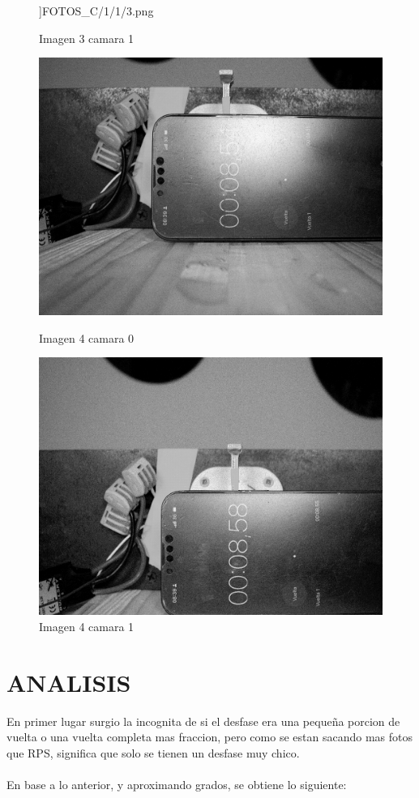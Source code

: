 \documentclass{article}
\begin{document}
\begin{figure}[H]
\begin{minipage}[b]{0.45\textwidth}
    \textwidth]{FOTOS_C/1/1/3.png}
    \caption{Imagen 3 camara 1}
  \end{minipage}
  \begin{minipage}[b]{0.45\textwidth}
    \centering
    \includegraphics[width=0.8
    \textwidth]{FOTOS_C/1/0/4.png}
    \caption{Imagen 4 camara 0}
  \end{minipage}
  \begin{minipage}[b]{0.45\textwidth}
    \centering
    \includegraphics[width=0.8
    \textwidth]{FOTOS_C/1/1/4.png}
    \caption{Imagen 4 camara 1}
  \end{minipage}
\end{figure}

\newpage
\section {ANALISIS}

En primer lugar surgio la incognita de si el desfase era una pequeña porcion de vuelta o una vuelta completa mas fraccion, pero como se 
estan sacando mas fotos que RPS, significa que solo se tienen un desfase muy chico.
\\ \\
En base a lo anterior, y aproximando grados, se obtiene lo siguiente:
\end{document}
